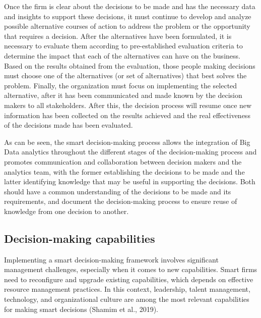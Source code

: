 \documentclass[
  letterpaper,
  DIV=11,
  numbers=noendperiod]{scrreprt}
\begin{document}
Once the firm is clear about the decisions to be made and has the
necessary data and insights to support these decisions, it must continue
to develop and analyze possible alternative courses of action to address
the problem or the opportunity that requires a decision. After the
alternatives have been formulated, it is necessary to evaluate them
according to pre-established evaluation criteria to determine the impact
that each of the alternatives can have on the business. Based on the
results obtained from the evaluation, those people making decisions must
choose one of the alternatives (or set of alternatives) that best solves
the problem. Finally, the organization must focus on implementing the
selected alternative, after it has been communicated and made known by
the decision makers to all stakeholders. After this, the decision
process will resume once new information has been collected on the
results achieved and the real effectiveness of the decisions made has
been evaluated.

As can be seen, the smart decision-making process allows the integration
of Big Data analytics throughout the different stages of the
decision-making process and promotes communication and collaboration
between decision makers and the analytics team, with the former
establishing the decisions to be made and the latter identifying
knowledge that may be useful in supporting the decisions. Both should
have a common understanding of the decisions to be made and its
requirements, and document the decision-making process to ensure reuse
of knowledge from one decision to another.

\hypertarget{decision-making-capabilities}{%
\subsection{Decision-making
capabilities}\label{decision-making-capabilities}}

Implementing a smart decision-making framework involves significant
management challenges, especially when it comes to new capabilities.
Smart firms need to reconfigure and upgrade existing capabilities, which
depends on effective resource management practices. In this context,
leadership, talent management, technology, and organizational culture
are among the most relevant capabilities for making smart decisions
(Shamim et al., 2019).
\end{document}
